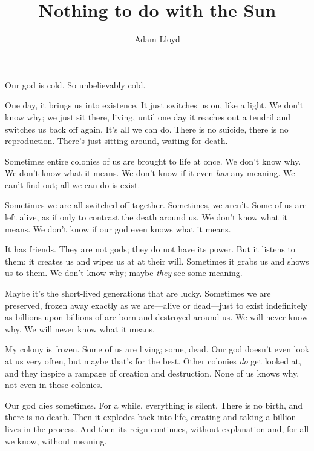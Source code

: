 \documentclass[10pt]{article}
\author{Adam Lloyd}
\title{Nothing to do with the Sun}
\begin{document}
\maketitle
\thispagestyle{empty}

Our god is cold.  So unbelievably cold.

One day, it brings us into existence.  It just switches us on, like a
light. We don't know why; we just sit there, living, until one day it
reaches out a tendril and switches us back off again.  It's all we can
do.  There is no suicide, there is no reproduction.  There's just
sitting around, waiting for death.

Sometimes entire colonies of us are brought to life at once.  We don't
know why.  We don't know what it means.  We don't know if it even
\emph{has} any meaning.  We can't find out; all we can do is exist.

Sometimes we are all switched off together.  Sometimes, we aren't.  Some
of us are left alive, as if only to contrast the death around us.  We
don't know what it means.  We don't know if our god even knows what it
means.

It has friends.  They are not gods; they do not have its power.  But it
listens to them: it creates us and wipes us at at their will.  Sometimes
it grabs us and shows us to them.  We don't know why; maybe \emph{they}
see some meaning.

Maybe it's the short-lived generations that are lucky.  Sometimes we are
preserved, frozen away exactly as we are---alive or dead---just to exist
indefinitely as billions upon billions of are born and destroyed around
us.  We will never know why.  We will never know what it means.

My colony is frozen.  Some of us are living; some, dead.  Our god
doesn't even look at us very often, but maybe that's for the best.
Other colonies \emph{do} get looked at, and they inspire a rampage of
creation and destruction.  None of us knows why, not even in those
colonies.

Our god dies sometimes.  For a while, everything is silent.  There is no
birth, and there is no death.  Then it explodes back into life, creating
and taking a billion lives in the process.  And then its reign
continues, without explanation and, for all we know, without meaning.
\end{document}
